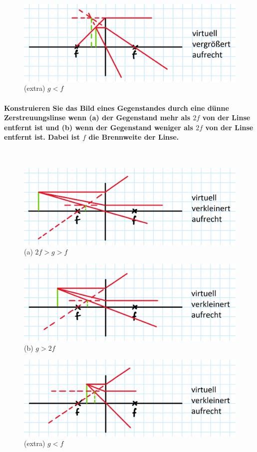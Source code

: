 \documentclass[a4paper, 11pt, ngerman, parskip=half-]{scrartcl}
\begin{document}
\begin{figure}[H]
    \centering
    \includegraphics[width=0.8\linewidth]{image/16/konvex_less.png}
    \caption{(extra) $g < f$}
\end{figure}

\paragraph{Konstruieren Sie das Bild eines Gegenstandes durch eine dünne Zerstreuungslinse wenn (a)
    der Gegenstand mehr als $2f$ von der Linse entfernt ist und (b) wenn der Gegenstand weniger
    als $2f$ von der Linse entfernt ist. Dabei ist $f$ die Brennweite der Linse.} ~

\begin{figure}[H]
    \centering
    \includegraphics[width=0.8\linewidth]{image/16/konkav_2f.png}
    \caption{(a) $2f > g > f$}
\end{figure}

\begin{figure}[H]
    \centering
    \includegraphics[width=0.8\linewidth]{image/16/konkav_f.png}
    \caption{(b) $g > 2f$}
\end{figure}

\begin{figure}[H]
    \centering
    \includegraphics[width=0.8\linewidth]{image/16/konkav_less.png}
    \caption{(extra) $g < f$}
\end{figure}
\end{document}

